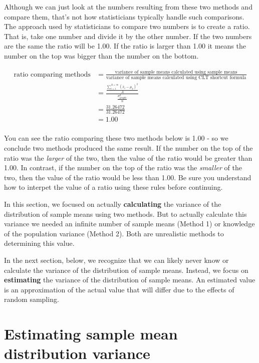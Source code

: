 \documentclass[
]{krantz}
\begin{document}
Although we can just look at the numbers resulting from these two methods and compare them, that's not how statisticians typically handle such comparisons. The approach used by statisticians to compare two numbers is to create a ratio. That is, take one number and divide it by the other number. If the two numbers are the same the ratio will be 1.00. If the ratio is larger than 1.00 it means the number on the top was bigger than the number on the bottom.

\hfill\break

\[
\begin{aligned} 
\text{ratio comparing methods} &= \frac{\text{variance of sample means calculated using sample means}}{\text{variance of sample means calculated using CLT shortcut formula}}\\
&=\frac{\frac{\sum_{i=1}^{A=\infty}{(\bar{x}_i - \mu_{\bar{x}})^2}}{A}}{\frac{\sigma_{people}^2}{n}}\\
&=\frac{31.26472}{31.26472}\\
&= 1.00\\
\end{aligned} 
\]

You can see the ratio comparing these two methods below is 1.00 - so we conclude two methods produced the same result. If the number on the top of the ratio was the \emph{larger} of the two, then the value of the ratio would be greater than 1.00. In contrast, if the number on the top of the ratio was the \emph{smaller} of the two, then the value of the ratio would be less than 1.00. Be sure you understand how to interpet the value of a ratio using these rules before continuing.

In this section, we focused on actually \textbf{calculating} the variance of the distribution of sample means using two methods. But to actually calculate this variance we needed an infinite number of sample means (Method 1) or knowledge of the population variance (Method 2). Both are unrealistic methods to determining this value.

In the next section, below, we recognize that we can likely never know or calculate the variance of the distribution of sample means. Instead, we focus on \textbf{estimating} the variance of the distribution of sample means. An estimated value is an approximation of the actual value that will differ due to the effects of random sampling.

\hypertarget{estimating-sample-mean-distribution-variance}{%
\section{Estimating sample mean distribution variance}\label{estimating-sample-mean-distribution-variance}}
\end{document}
